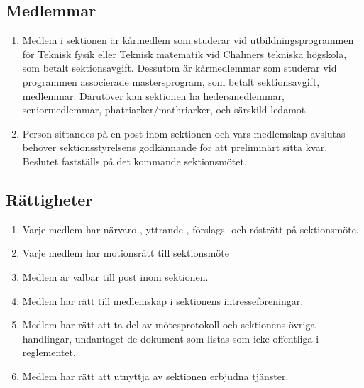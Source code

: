 \documentclass[11pt,a4paper]{article}
\begin{document}
\subsection{Medlemmar}
\begin{enumerate}[\thesubsection.1]
   
  \item Medlem i sektionen är kårmedlem som studerar vid utbildningsprogrammen för Teknisk fysik eller Teknisk matematik vid Chalmers tekniska högskola, som betalt sektionsavgift. Dessutom är kårmedlemmar som studerar vid programmen associerade mastersprogram, som betalt sektionsavgift, medlemmar. Därutöver kan sektionen ha hedersmedlemmar, seniormedlemmar, phatriarker/mathriarker, och särskild ledamot.
   
  \item Person sittandes på en post inom sektionen och vars medlemskap avslutas behöver sektionsstyrelsens godkännande för att preliminärt sitta kvar. Beslutet fastställs på det kommande sektionsmötet.
   
\end{enumerate}



\subsection{Rättigheter}
\begin{enumerate}[\thesubsection.1]

  \item Varje medlem har närvaro-, yttrande-, förslags- och rösträtt
   på sektionsmöte.
   
  \item Varje medlem har motionsrätt till sektionsmöte

  \item Medlem är valbar till post inom sektionen.

  \item Medlem har rätt till medlemskap i sektionens intresseföreningar.

  \item Medlem har rätt att ta del av mötesprotokoll och sektionens övriga handlingar,
   undantaget de dokument som listas som icke offentliga i reglementet.

  \item Medlem har rätt att utnyttja av sektionen erbjudna tjänster.

\end{enumerate}
\end{document}
